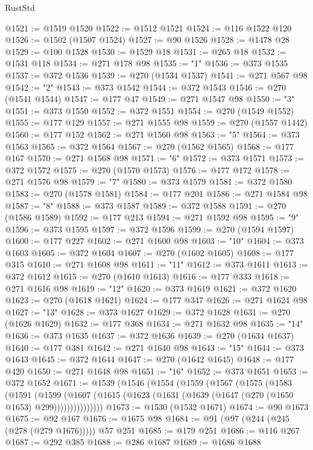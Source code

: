 \begin{lexlean}{RustStd}
\begin{coremodule}
@1521 := @1519 @1520
@1522 := @1512 @1521
@1524 := @116 @1522 @120
@1526 := @1502 (@1507 @1524)
@1527 := @90 @1526
@1528 := @1478 @28
@1529 := @100 @1528
@1530 := @1529 @18
@1531 := @265 @18
@1532 := @1531 @118
@1534 := @271 @178 @98
@1535 := "1"
@1536 := @373 @1535
@1537 := @372 @1536
@1539 := @270 (@1534 @1537)
@1541 := @271 @567 @98
@1542 := "2"
@1543 := @373 @1542
@1544 := @372 @1543
@1546 := @270 (@1541 @1544)
@1547 := @177 @47
@1549 := @271 @1547 @98
@1550 := "3"
@1551 := @373 @1550
@1552 := @372 @1551
@1554 := @270 (@1549 @1552)
@1555 := @177 @129
@1557 := @271 @1555 @98
@1559 := @270 (@1557 @1442)
@1560 := @177 @152
@1562 := @271 @1560 @98
@1563 := "5"
@1564 := @373 @1563
@1565 := @372 @1564
@1567 := @270 (@1562 @1565)
@1568 := @177 @167
@1570 := @271 @1568 @98
@1571 := "6"
@1572 := @373 @1571
@1573 := @372 @1572
@1575 := @270 (@1570 @1573)
@1576 := @177 @172
@1578 := @271 @1576 @98
@1579 := "7"
@1580 := @373 @1579
@1581 := @372 @1580
@1583 := @270 (@1578 @1581)
@1584 := @177 @201
@1586 := @271 @1584 @98
@1587 := "8"
@1588 := @373 @1587
@1589 := @372 @1588
@1591 := @270 (@1586 @1589)
@1592 := @177 @213
@1594 := @271 @1592 @98
@1595 := "9"
@1596 := @373 @1595
@1597 := @372 @1596
@1599 := @270 (@1594 @1597)
@1600 := @177 @227
@1602 := @271 @1600 @98
@1603 := "10"
@1604 := @373 @1603
@1605 := @372 @1604
@1607 := @270 (@1602 @1605)
@1608 := @177 @315
@1610 := @271 @1608 @98
@1611 := "11"
@1612 := @373 @1611
@1613 := @372 @1612
@1615 := @270 (@1610 @1613)
@1616 := @177 @333
@1618 := @271 @1616 @98
@1619 := "12"
@1620 := @373 @1619
@1621 := @372 @1620
@1623 := @270 (@1618 @1621)
@1624 := @177 @347
@1626 := @271 @1624 @98
@1627 := "13"
@1628 := @373 @1627
@1629 := @372 @1628
@1631 := @270 (@1626 @1629)
@1632 := @177 @368
@1634 := @271 @1632 @98
@1635 := "14"
@1636 := @373 @1635
@1637 := @372 @1636
@1639 := @270 (@1634 @1637)
@1640 := @177 @381
@1642 := @271 @1640 @98
@1643 := "15"
@1644 := @373 @1643
@1645 := @372 @1644
@1647 := @270 (@1642 @1645)
@1648 := @177 @420
@1650 := @271 @1648 @98
@1651 := "16"
@1652 := @373 @1651
@1653 := @372 @1652
@1671 := @1539
    (@1546
      (@1554
        (@1559
          (@1567
            (@1575
              (@1583
                (@1591
                  (@1599
                    (@1607
                      (@1615 (@1623 (@1631 (@1639 (@1647 (@270 (@1650 @1653) @299)))))))))))))))
@1673 := @1530 (@1532 @1671)
@1674 := @90 @1673
@1675 := @92 @167
@1676 := @1675 @98
@1684 := @91 (@97 (@244 (@245 (@278 (@279 @1676))))) @57 @251
@1685 := @179 @251
@1686 := @116 @267
@1687 := @292 @385
@1688 := @286 @1687
@1689 := @1686 @1688

\end{coremodule}
\end{lexlean}
